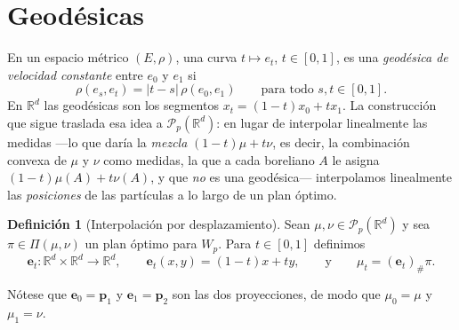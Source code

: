 \documentclass[12pt, a4paper]{amsbook}
\newcommand{\R}{{\mathbb R}}
\newcommand{\ee}{{\mathbf e}}
\newcommand{\pp}{{\mathbf p}}
\theoremstyle{remark}
\theoremstyle{definition}
\newtheorem{defi}[teo]{Definición}
\numberwithin{section}{chapter}
\numberwithin{subsection}{section}
\numberwithin{equation}{section}
\numberwithin{figure}{chapter}
\begin{document}
\section{Geodésicas}\label{sec.Wp.geodesicas}

En un espacio métrico $(E,\rho)$, una curva $t\mapsto e_t$, $t\in[0,1]$, es
una \emph{geodésica de velocidad constante} entre $e_0$ y $e_1$ si
\[
\rho(e_s,e_t)=|t-s|\,\rho(e_0,e_1)
\qquad\text{para todo }s,t\in[0,1].
\]
En $\R^d$ las geodésicas son los segmentos $x_t=(1-t)x_0+tx_1$. La
construcción que sigue traslada esa idea a $\mathcal P_p(\R^d)$: en lugar de
interpolar linealmente las medidas —lo que daría la \emph{mezcla}
$(1-t)\mu+t\nu$, es decir, la combinación convexa de $\mu$ y $\nu$ como
medidas, la que a cada boreliano $A$ le asigna $(1-t)\mu(A)+t\nu(A)$, y que
\emph{no} es una geodésica— interpolamos linealmente las \emph{posiciones}
de las partículas a lo largo de un plan óptimo.

\begin{defi}[Interpolación por desplazamiento]\label{def.desplazamiento}
Sean $\mu,\nu\in\mathcal P_p(\R^d)$ y sea $\pi\in\Pi(\mu,\nu)$ un plan óptimo
para $W_p$. Para $t\in[0,1]$ definimos
\[
\ee_t\colon\R^d\times\R^d\to\R^d,
\qquad
\ee_t(x,y)=(1-t)x+ty,
\qquad\text{y}\qquad
\mu_t=(\ee_t)_\#\pi.
\]
\end{defi}

Nótese que $\ee_0=\pp_1$ y $\ee_1=\pp_2$ son las dos proyecciones, de modo
que $\mu_0=\mu$ y $\mu_1=\nu$.
\end{document}
